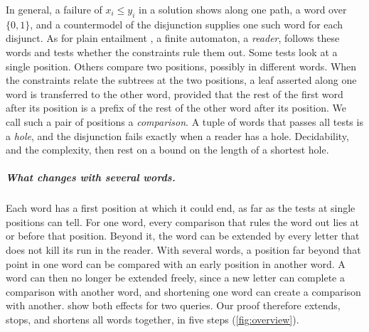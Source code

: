 In general, a failure of $x_i\le y_i$ in a solution shows along one path, a word over
$\{0,1\}$, and a countermodel of the disjunction supplies one such word for each disjunct.
As for plain entailment \cite{NiehrenPriesnitz03,NSSE26}, a finite automaton, a
\emph{reader}, follows these words and tests whether the constraints rule them out. Some
tests look at a single position. Others compare two positions, possibly in different words.
When the constraints relate the subtrees at the two positions, a leaf asserted along one
word is transferred to the other word, provided that the rest of the first word after its
position is a prefix of the rest of the other word after its position. We call such a pair
of positions a \emph{comparison}. A tuple of words that passes all tests is a \emph{hole},
and the disjunction fails exactly when a reader has a hole. Decidability, and the
complexity, then rest on a bound on the length of a shortest hole.

\subparagraph*{What changes with several words.}
Each word has a first position at which it could end, as far as the tests at single
positions can tell. For one word, every comparison that rules the word out lies at or
before that position. Beyond it, the word can be extended by every letter that does not
kill its run in the reader. With several words, a position far beyond that point in one word
can be compared with an early position in another word. A word can then no longer be
extended freely, since a new letter can complete a comparison with another word, and
shortening one word can create a comparison with another. 
show both effects for two queries. Our proof therefore extends, stops, and shortens all words together, in five
steps (\cref{fig:overview}).

